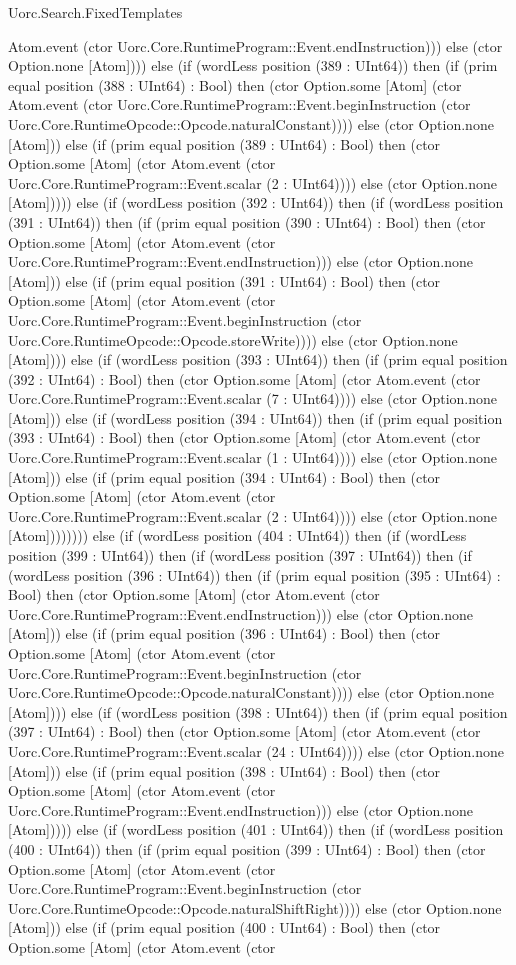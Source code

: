 \begin{lexlean}{Uorc.Search.FixedTemplates}
\begin{semanticmodule}
{Atom.event (ctor Uorc.Core.RuntimeProgram::Event.endInstruction))) else (ctor Option.none [Atom]))) else (if (wordLess position (389 : UInt64)) then (if (prim equal position (388 : UInt64) : Bool) then (ctor Option.some [Atom] (ctor Atom.event (ctor Uorc.Core.RuntimeProgram::Event.beginInstruction (ctor Uorc.Core.RuntimeOpcode::Opcode.naturalConstant)))) else (ctor Option.none [Atom])) else (if (prim equal position (389 : UInt64) : Bool) then (ctor Option.some [Atom] (ctor Atom.event (ctor Uorc.Core.RuntimeProgram::Event.scalar (2 : UInt64)))) else (ctor Option.none [Atom])))) else (if (wordLess position (392 : UInt64)) then (if (wordLess position (391 : UInt64)) then (if (prim equal position (390 : UInt64) : Bool) then (ctor Option.some [Atom] (ctor Atom.event (ctor Uorc.Core.RuntimeProgram::Event.endInstruction))) else (ctor Option.none [Atom])) else (if (prim equal position (391 : UInt64) : Bool) then (ctor Option.some [Atom] (ctor Atom.event (ctor Uorc.Core.RuntimeProgram::Event.beginInstruction (ctor Uorc.Core.RuntimeOpcode::Opcode.storeWrite)))) else (ctor Option.none [Atom]))) else (if (wordLess position (393 : UInt64)) then (if (prim equal position (392 : UInt64) : Bool) then (ctor Option.some [Atom] (ctor Atom.event (ctor Uorc.Core.RuntimeProgram::Event.scalar (7 : UInt64)))) else (ctor Option.none [Atom])) else (if (wordLess position (394 : UInt64)) then (if (prim equal position (393 : UInt64) : Bool) then (ctor Option.some [Atom] (ctor Atom.event (ctor Uorc.Core.RuntimeProgram::Event.scalar (1 : UInt64)))) else (ctor Option.none [Atom])) else (if (prim equal position (394 : UInt64) : Bool) then (ctor Option.some [Atom] (ctor Atom.event (ctor Uorc.Core.RuntimeProgram::Event.scalar (2 : UInt64)))) else (ctor Option.none [Atom]))))))) else (if (wordLess position (404 : UInt64)) then (if (wordLess position (399 : UInt64)) then (if (wordLess position (397 : UInt64)) then (if (wordLess position (396 : UInt64)) then (if (prim equal position (395 : UInt64) : Bool) then (ctor Option.some [Atom] (ctor Atom.event (ctor Uorc.Core.RuntimeProgram::Event.endInstruction))) else (ctor Option.none [Atom])) else (if (prim equal position (396 : UInt64) : Bool) then (ctor Option.some [Atom] (ctor Atom.event (ctor Uorc.Core.RuntimeProgram::Event.beginInstruction (ctor Uorc.Core.RuntimeOpcode::Opcode.naturalConstant)))) else (ctor Option.none [Atom]))) else (if (wordLess position (398 : UInt64)) then (if (prim equal position (397 : UInt64) : Bool) then (ctor Option.some [Atom] (ctor Atom.event (ctor Uorc.Core.RuntimeProgram::Event.scalar (24 : UInt64)))) else (ctor Option.none [Atom])) else (if (prim equal position (398 : UInt64) : Bool) then (ctor Option.some [Atom] (ctor Atom.event (ctor Uorc.Core.RuntimeProgram::Event.endInstruction))) else (ctor Option.none [Atom])))) else (if (wordLess position (401 : UInt64)) then (if (wordLess position (400 : UInt64)) then (if (prim equal position (399 : UInt64) : Bool) then (ctor Option.some [Atom] (ctor Atom.event (ctor Uorc.Core.RuntimeProgram::Event.beginInstruction (ctor Uorc.Core.RuntimeOpcode::Opcode.naturalShiftRight)))) else (ctor Option.none [Atom])) else (if (prim equal position (400 : UInt64) : Bool) then (ctor Option.some [Atom] (ctor Atom.event (ctor }
\end{semanticmodule}
\end{lexlean}
